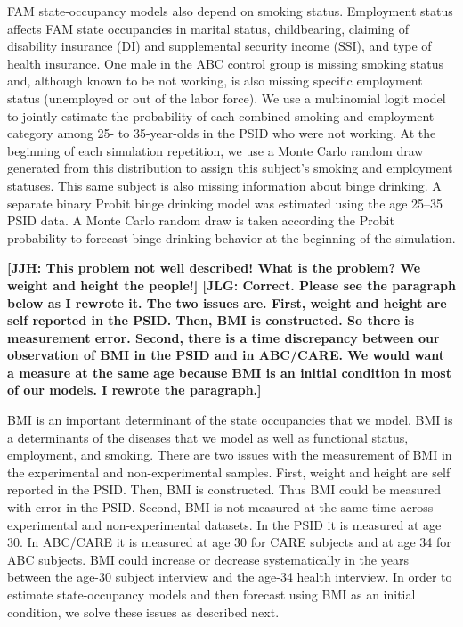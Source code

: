 \noindent FAM state-occupancy models also depend on smoking status. Employment status affects FAM state occupancies in marital status, childbearing, claiming of disability insurance (DI) and supplemental security income (SSI), and type of health insurance.
One male in the ABC control group is missing smoking status and, although known to be not working, is also missing specific employment status (unemployed or out of the labor force).
 We use a multinomial logit model to jointly estimate the probability of each combined smoking and employment category among 25- to 35-year-olds in the PSID who were not working. At the beginning of each simulation repetition, we use a Monte Carlo random draw generated from this distribution to assign this subject's smoking and employment statuses. This same subject is also missing information about binge drinking. A separate binary Probit binge drinking model was estimated using the age 25--35 PSID data. A Monte Carlo random draw is taken according the Probit probability to forecast binge drinking behavior at the beginning of the simulation.

\noindent \textbf{[JJH: This problem not well described! What is the problem? We weight and height the people!] [JLG: Correct. Please see the paragraph below as I rewrote it. The two issues are. First, weight and height are self reported in the PSID. Then, BMI is constructed. So there is measurement error. Second, there is a time discrepancy between our observation of BMI in the PSID and in ABC/CARE. We would want a measure at the same age because BMI is an initial condition in most of our models. I rewrote the paragraph.]}

\noindent BMI is an important determinant of the state occupancies that we model. BMI is a determinants of the diseases that we model as well as functional status, employment, and smoking. There are two issues with the measurement of BMI in the experimental and non-experimental samples. First, weight and height are self reported in the PSID. Then, BMI is constructed. Thus BMI could be measured with error in the PSID. Second, BMI is not measured at the same time across experimental and non-experimental datasets. In the PSID it is measured at age 30. In ABC/CARE it is measured at age 30 for CARE subjects and at age 34 for ABC subjects. BMI could increase or decrease systematically in the years between the age-30 subject interview and the age-34 health interview. In order to estimate state-occupancy models and then forecast using BMI as an initial condition, we solve these issues as described next.

